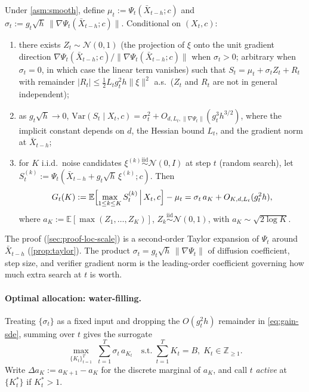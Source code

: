 \begin{theorem}
\label{thm:loc-scale}
Under \cref{asm:smooth}, define $\mu_t := \Psi_t(\bar{X}_{t-h};c)$ and $\sigma_t := g_t\sqrt{h}\,\|\nabla\Psi_t(\bar{X}_{t-h};c)\|$. Conditional on $(X_t,c)$:
\begin{enumerate}
\item[\textup{(i)}] there exists $Z_t\sim\mathcal{N}(0,1)$ (the projection of $\xi$ onto the unit gradient direction $\nabla\Psi_t(\bar X_{t-h};c)/\|\nabla\Psi_t(\bar X_{t-h};c)\|$ when $\sigma_t>0$; arbitrary when $\sigma_t=0$, in which case the linear term vanishes) such that $S_t = \mu_t + \sigma_t Z_t + R_t$ with remainder $|R_t|\le\tfrac{1}{2}L_t g_t^2 h\|\xi\|^2$ a.s.\ ($Z_t$ and $R_t$ are not in general independent);
\item[\textup{(ii)}] as $g_t\sqrt{h}\to 0$, $\mathrm{Var}(S_t\mid X_t,c) = \sigma_t^2 + O_{d, L_t, \|\nabla\Psi_t\|}(g_t^3 h^{3/2})$, where the implicit constant depends on $d$, the Hessian bound $L_t$, and the gradient norm at $\bar X_{t-h}$;
\item[\textup{(iii)}] for $K$ i.i.d.\ noise candidates $\xi^{(k)}\stackrel{\text{iid}}\sim\mathcal N(0,I)$ at step $t$ (random search), let $S_t^{(k)}:=\Psi_t(\bar X_{t-h}+g_t\sqrt h\,\xi^{(k)};c)$. Then
\begin{equation}
G_t(K) := \mathbb{E}\Bigl[\max_{1\le k\le K} S_t^{(k)}\,\Big|\,X_t,c\Bigr] - \mu_t = \sigma_t\,a_K + O_{K,d,L_t}(g_t^2 h),
\label{eq:gain-sde}
\end{equation}
where $a_K := \mathbb E[\max(Z_1,\ldots,Z_K)]$, $Z_k\overset{\text{iid}}\sim\mathcal N(0,1)$, with $a_K\sim\sqrt{2\log K}$.
\end{enumerate}
\end{theorem}

The proof (\cref{sec:proof-loc-scale}) is a second-order Taylor expansion of $\Psi_t$ around $\bar{X}_{t-h}$ (\cref{prop:taylor}). The product $\sigma_t = g_t\sqrt{h}\,\|\nabla\Psi_t\|$ of diffusion coefficient, step size, and verifier gradient norm is the leading-order coefficient governing how much extra search at $t$ is worth.

\paragraph{Optimal allocation: water-filling.}
Treating $\{\sigma_t\}$ as a fixed input and dropping the $O(g_t^2 h)$ remainder in \cref{eq:gain-sde}, summing over $t$ gives the surrogate
\begin{equation}
  \max_{\{K_t\}_{t=1}^T}\;\sum_{t=1}^{T}\sigma_t\,a_{K_t}
  \quad\text{s.t.}\;\sum_{t=1}^{T}K_t=B,\;K_t\in\mathbb{Z}_{\ge 1}.
  \label{eq:alloc}
\end{equation}
Write $\Delta a_K := a_{K+1}-a_K$ for the discrete marginal of $a_K$, and call $t$ \emph{active} at $\{K_t^*\}$ if $K_t^* > 1$.

